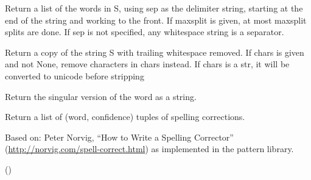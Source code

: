 \documentclass[letterpaper,10pt,english]{sphinxmanual}
\begin{document}
\begin{fulllineitems}

\begin{fulllineitems}
\label{api_reference:textblob_de.blob.Word.rsplit}
Return a list of the words in S, using sep as the
delimiter string, starting at the end of the string and
working to the front.  If maxsplit is given, at most maxsplit
splits are done. If sep is not specified, any whitespace string
is a separator.

\end{fulllineitems}


\begin{fulllineitems}
\label{api_reference:textblob_de.blob.Word.rstrip}
Return a copy of the string S with trailing whitespace removed.
If chars is given and not None, remove characters in chars instead.
If chars is a str, it will be converted to unicode before stripping

\end{fulllineitems}


\begin{fulllineitems}
\label{api_reference:textblob_de.blob.Word.singularize}
Return the singular version of the word as a string.

\end{fulllineitems}


\begin{fulllineitems}
\label{api_reference:textblob_de.blob.Word.spellcheck}
Return a list of (word, confidence) tuples of spelling corrections.

Based on: Peter Norvig, ``How to Write a Spelling Corrector''
(\href{http://norvig.com/spell-correct.html}{http://norvig.com/spell-correct.html}) as implemented in the pattern
library.

()

\end{fulllineitems}


\end{fulllineitems}
\end{document}
